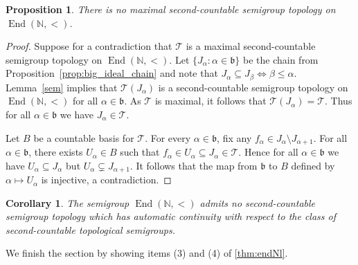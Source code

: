 \documentclass[11pt]{amsart}
\newtheorem{proposition}[theorem]{Proposition}
\newtheorem{corollary}[theorem]{Corollary}
\newtheorem{lemma}[theorem]{Lemma}
\theoremstyle{definition}
\newcommand{\w}{\omega}
\newcommand{\Tau}{\mathcal T}
\newcommand{\End}{\operatorname{End}(\mathbb N, <)}
\begin{document}
\begin{proposition}\label{nosecondAC}
  There is no maximal second-countable semigroup topology on $\End$. 
\end{proposition}
\begin{proof}
    Suppose for a contradiction that \(\Tau\) is a maximal second-countable semigroup topology on \(\End\).
    Let \(\{J_{\alpha}:\alpha\in\mathfrak b\}\) be the chain from Proposition~\ref{prop:big_ideal_chain} and note that \(J_{\alpha}\subseteq J_{\beta} \iff \beta \leq \alpha\). 
    Lemma~\ref{sem} implies that \(\Tau (J_\alpha)\) is a second-countable semigroup topology on \(\End\) for all \(\alpha \in \mathfrak b \). 
    As \(\Tau\) is maximal, it follows that \(\Tau (J_\alpha)=\Tau\). Thus for all \(\alpha\in \mathfrak{b}\) we have \(J_\alpha\in \Tau\).
    
    
    Let \(B\) be a countable basis for \(\Tau\). For every \(\alpha\in \mathfrak b\), fix any \(f_\alpha \in J_\alpha\setminus J_{\alpha+1}\). For all \(\alpha\in \mathfrak b\), there exists \(U_\alpha\in B\) such that \(f_\alpha\in U_\alpha\subseteq J_\alpha\in \Tau\). 
    Hence for all \(\alpha\in \mathfrak b\) we have \(U_\alpha\subseteq J_\alpha\) but \(U_\alpha\subsetneq J_{\alpha+1}\). It follows that the map from \(\mathfrak b\) to \(B\) defined by \(\alpha\mapsto U_\alpha\) is injective, a contradiction.
\end{proof}

\begin{corollary}
 The semigroup $\End$ admits no second-countable semigroup topology which has automatic continuity with respect to the class of second-countable topological semigroups. 
\end{corollary}

We finish the section by showing items (3) and (4) of \cref{thm:endNl}.

\end{document}
